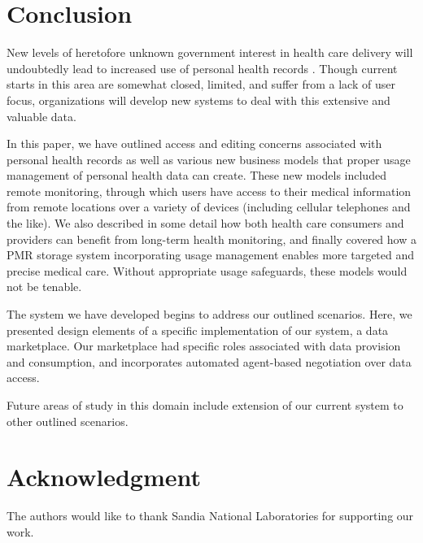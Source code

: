 \documentclass[10pt, conference, compsocconf]{IEEEtran}
\begin{document}
\section{Conclusion}
New levels of heretofore unknown government interest in health care delivery will undoubtedly lead to increased use of personal health records \cite{Emr:Web:Recovery}.  Though current starts in this area are somewhat closed, limited, and suffer from a lack of user focus, organizations will develop new systems to deal with this extensive and valuable data.

In this paper, we have outlined access and editing concerns associated with personal health records as well as various new business models that proper usage management of personal health data can create.  These new models included remote monitoring, through which users have access to their medical information from remote locations over a variety of devices (including cellular telephones and the like).  We also described in some detail how both health care consumers and providers can benefit from long-term health monitoring, and finally covered how a PMR storage system incorporating usage management enables more targeted and precise medical care.  Without appropriate usage safeguards, these models would not be tenable.

The system we have developed begins to address our outlined scenarios.  Here, we presented design elements of a specific implementation of our system, a data marketplace.  Our marketplace had specific roles associated with data provision and consumption, and incorporates automated agent-based negotiation over data access.

Future areas of study in this domain include extension of our current system to other outlined scenarios.





\section*{Acknowledgment}
The authors would like to thank Sandia National Laboratories for supporting our work.


\end{document}
